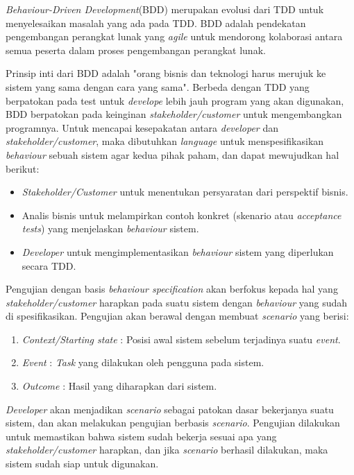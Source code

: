 \documentclass[a4paper,twoside]{article}
\begin{document}
\textit{Behaviour-Driven Development}(BDD) merupakan evolusi dari TDD untuk menyelesaikan masalah yang ada pada TDD. BDD adalah pendekatan pengembangan perangkat lunak yang \textit{agile} untuk mendorong kolaborasi antara semua peserta dalam proses pengembangan perangkat lunak.

Prinsip inti dari BDD adalah "orang bisnis dan teknologi harus merujuk ke sistem yang sama dengan cara yang sama". Berbeda dengan TDD yang berpatokan pada test untuk \textit{develope} lebih jauh program yang akan digunakan, BDD berpatokan pada keinginan \textit{stakeholder/customer} untuk mengembangkan programnya. Untuk mencapai kesepakatan antara \textit{developer} dan \textit{stakeholder/customer}, maka dibutuhkan \textit{language} untuk menspesifikasikan \textit{behaviour} sebuah sistem agar kedua pihak paham, dan dapat mewujudkan hal berikut:
\begin{itemize}
\item \textit{Stakeholder/Customer} untuk menentukan persyaratan dari perspektif bisnis.
\item Analis bisnis untuk melampirkan contoh konkret (skenario atau \textit{acceptance tests}) yang menjelaskan \textit{behaviour} sistem.
\item \textit{Developer} untuk mengimplementasikan \textit{behaviour} sistem yang diperlukan secara TDD.
\end{itemize}
	
Pengujian dengan basis \textit{behaviour specification} akan berfokus kepada hal yang \textit{stakeholder/customer} harapkan pada suatu sistem dengan \textit{behaviour} yang sudah di spesifikasikan. Pengujian akan berawal dengan membuat \textit{scenario} yang berisi:
\begin{enumerate}
\item \textit{Context/Starting state} : Posisi awal sistem sebelum terjadinya suatu \textit{event}.
\item \textit{Event} : \textit{Task} yang dilakukan oleh pengguna pada sistem.
\item \textit{Outcome} : Hasil yang diharapkan dari sistem.
\end{enumerate}
\textit{Developer} akan menjadikan \textit{scenario} sebagai patokan dasar bekerjanya suatu sistem, dan akan melakukan pengujian berbasis \textit{scenario}. Pengujian dilakukan untuk memastikan bahwa sistem sudah bekerja sesuai apa yang \textit{stakeholder/customer} harapkan, dan jika \textit{scenario} berhasil dilakukan, maka sistem sudah siap untuk digunakan.
\end{document}

